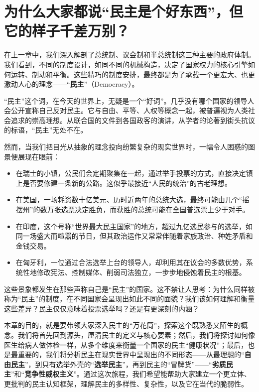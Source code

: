 

\chapter{为什么大家都说“民主是个好东西”，但它的样子千差万别？}

在上一章中，我们深入解剖了总统制、议会制和半总统制这三种主要的政府体制。我们看到，不同的制度设计，如同不同的机械构造，决定了国家权力的核心引擎如何运转、制动和平衡。这些精巧的制度安排，最终都是为了承载一个更宏大、也更激动人心的理念——“\textbf{民主}”（Democracy）。

“民主”这个词，在今天的世界上，无疑是一个“好词”。几乎没有哪个国家的领导人会公开宣称自己反对民主。它与自由、平等、人权等概念一起，被普遍视为人类社会追求的崇高理想。从联合国的文件到各国政客的演讲，从学者的论著到街头抗议的标语，“民主”无处不在。

然而，当我们把目光从抽象的理念投向纷繁复杂的现实世界时，一幅令人困惑的图景便展现在眼前：

\begin{itemize}
    \item 在瑞士的小镇，公民们会定期聚集在一起，通过举手投票的方式，直接决定镇上是否要修建一条新的公路。这似乎最接近“人民的统治”的古老理想。
    \item 在美国，一场耗资数十亿美元、历时近两年的总统大选，最终可能由几个“摇摆州”的数万张选票决定胜负，而获胜的总统可能在全国普选票上少于对手。
    \item 在印度，这个号称“世界最大民主国家”的地方，超过九亿选民参与的选举，如同一场盛大而喧嚣的节日，但其政治运作又常常伴随着家族政治、种姓矛盾和金钱交易。
    \item 在匈牙利，一位通过合法选举上台的领导人，却利用其在议会的多数优势，系统性地修改宪法、控制媒体、削弱司法独立，一步步地侵蚀着民主的根基。
\end{itemize}

这些景象都发生在那些声称自己是“民主”的国家。这不禁让人思考：为什么同样被称为“民主”的制度，在不同国家会呈现出如此不同的面貌？我们该如何理解和衡量这些差异？民主仅仅意味着投票选举吗？还是有更深刻的内涵？

本章的目的，就是要带领大家深入民主的“万花筒”，探索这个既熟悉又陌生的概念。我们将首先回到源头，厘清民主的定义与核心要素；然后，我们将探讨如何像医生给病人做体检一样，从多个维度来衡量一个国家的民主“健康状况”；最后，也是最重要的，我们将分析民主在现实世界中呈现出的不同形态——从最理想的“\textbf{自由民主}”，到只有选举外壳的“\textbf{选举民主}”，再到民主的“冒牌货”——“\textbf{劣质民主}”和“\textbf{竞争性威权主义}”。通过这次旅程，我们希望能帮助大家建立一个更立体、更批判的民主认知框架，理解民主的多样性、复杂性，以及它在当代的脆弱性。

